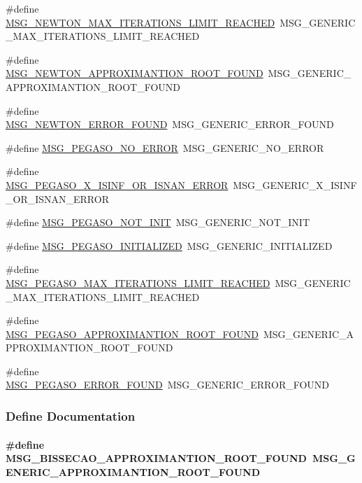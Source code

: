\begin{CompactItemize}
\item 
\#define \hyperlink{group____messages_g945597514c7386c4cf8501ed89dea0ec}{MSG\_\-NEWTON\_\-MAX\_\-ITERATIONS\_\-LIMIT\_\-REACHED}~MSG\_\-GENERIC\_\-MAX\_\-ITERATIONS\_\-LIMIT\_\-REACHED
\item 
\#define \hyperlink{group____messages_g6a854f8d5023cff404a1462cb4ec86ec}{MSG\_\-NEWTON\_\-APPROXIMANTION\_\-ROOT\_\-FOUND}~MSG\_\-GENERIC\_\-APPROXIMANTION\_\-ROOT\_\-FOUND
\item 
\#define \hyperlink{group____messages_g07aef7b29efc8c9c6175746948f1e909}{MSG\_\-NEWTON\_\-ERROR\_\-FOUND}~MSG\_\-GENERIC\_\-ERROR\_\-FOUND
\item 
\#define \hyperlink{group____messages_g007c9369adc25cf104727b8838460c48}{MSG\_\-PEGASO\_\-NO\_\-ERROR}~MSG\_\-GENERIC\_\-NO\_\-ERROR
\item 
\#define \hyperlink{group____messages_g0785e9a82bbfd11bf313a7bde2f302dd}{MSG\_\-PEGASO\_\-X\_\-ISINF\_\-OR\_\-ISNAN\_\-ERROR}~MSG\_\-GENERIC\_\-X\_\-ISINF\_\-OR\_\-ISNAN\_\-ERROR
\item 
\#define \hyperlink{group____messages_ga35bc5993a30a166820f1bbf7843646d}{MSG\_\-PEGASO\_\-NOT\_\-INIT}~MSG\_\-GENERIC\_\-NOT\_\-INIT
\item 
\#define \hyperlink{group____messages_g1f0c0e6ae1166d8ebb0e48216dbd2c8b}{MSG\_\-PEGASO\_\-INITIALIZED}~MSG\_\-GENERIC\_\-INITIALIZED
\item 
\#define \hyperlink{group____messages_g7559f15f358baf95e22bf7c7acea5fa1}{MSG\_\-PEGASO\_\-MAX\_\-ITERATIONS\_\-LIMIT\_\-REACHED}~MSG\_\-GENERIC\_\-MAX\_\-ITERATIONS\_\-LIMIT\_\-REACHED
\item 
\#define \hyperlink{group____messages_g4d326b97fe84c2b5bb115e5c98e7b10e}{MSG\_\-PEGASO\_\-APPROXIMANTION\_\-ROOT\_\-FOUND}~MSG\_\-GENERIC\_\-APPROXIMANTION\_\-ROOT\_\-FOUND
\item 
\#define \hyperlink{group____messages_g7dea968f607ba6d45ced25ab97a9030c}{MSG\_\-PEGASO\_\-ERROR\_\-FOUND}~MSG\_\-GENERIC\_\-ERROR\_\-FOUND
\end{CompactItemize}


\subsubsection{Define Documentation}
\hypertarget{group____messages_g419a2b04764be63f8c5bd9a2d561fbdf}{
\paragraph[MSG\_\-BISSECAO\_\-APPROXIMANTION\_\-ROOT\_\-FOUND]{\setlength{\rightskip}{0pt plus 5cm}\#define MSG\_\-BISSECAO\_\-APPROXIMANTION\_\-ROOT\_\-FOUND~MSG\_\-GENERIC\_\-APPROXIMANTION\_\-ROOT\_\-FOUND}\hfill}
\label{group____messages_g419a2b04764be63f8c5bd9a2d561fbdf}




